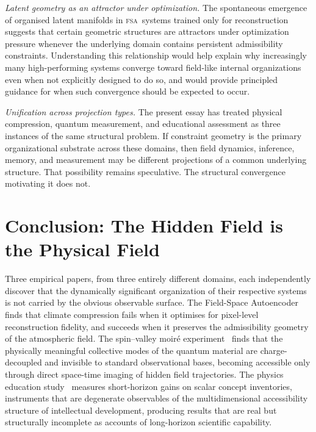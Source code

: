 \documentclass[11pt,a4paper]{article}
\theoremstyle{plain}
\theoremstyle{definition}
\theoremstyle{remark}
\newcommand{\FSA}{\textup{\textsc{fsa}}}
\begin{document}
\textit{Latent geometry as an attractor under optimization.} The spontaneous
emergence of organised latent manifolds in \FSA\ systems trained only for
reconstruction suggests that certain geometric structures are attractors
under optimization pressure whenever the underlying domain contains persistent
admissibility constraints. Understanding this relationship would help explain
why increasingly many high-performing systems converge toward field-like
internal organizations even when not explicitly designed to do so, and would
provide principled guidance for when such convergence should be expected to
occur.

\textit{Unification across projection types.} The present essay has treated
physical compression, quantum measurement, and educational assessment as
three instances of the same structural problem. If constraint geometry is
the primary organizational substrate across these domains, then field
dynamics, inference, memory, and measurement may be different projections
of a common underlying structure. That possibility remains speculative. The
structural convergence motivating it does not.

\section{Conclusion: The Hidden Field is the Physical Field}
\label{sec:conclusion}

Three empirical papers, from three entirely different domains, each
independently discover that the dynamically significant organization of their
respective systems is not carried by the obvious observable surface. The
Field-Space Autoencoder~\cite{Meuer2026} finds that climate compression
fails when it optimises for pixel-level reconstruction fidelity, and succeeds
when it preserves the admissibility geometry of the atmospheric field. The
spin--valley moiré experiment~\cite{Xiong2026} finds that the physically
meaningful collective modes of the quantum material are charge-decoupled and
invisible to standard observational bases, becoming accessible only through
direct space-time imaging of hidden field trajectories. The physics education
study~\cite{Sundstrom2025} measures short-horizon gains on scalar concept
inventories, instruments that are degenerate observables of the multidimensional
accessibility structure of intellectual development, producing results that are
real but structurally incomplete as accounts of long-horizon scientific
capability.
\end{document}
